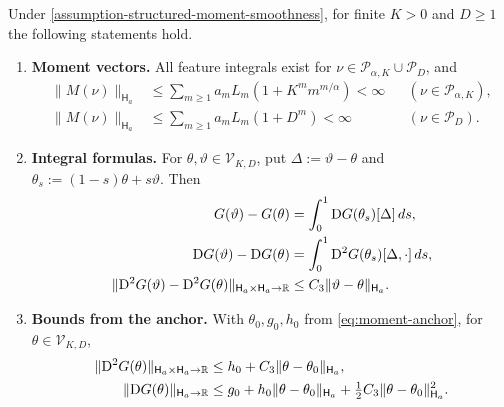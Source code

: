 \begin{lemma}
\label{lem:moment-integral-formulas}
Under \cref{assumption-structured-moment-smoothness}, for finite $K>0$
and $D\ge1$ the following statements hold.
\begin{enumerate}[label=(\roman*),leftmargin=*]
\item \textbf{Moment vectors.}
All feature integrals exist for $\nu\in\mathcal P_{\alpha,K}\cup\mathcal P_D$,
and
\begin{equation}
\label{eq:weighted-population-moment-summability}
\begin{aligned}
 \|M(\nu)\|_{\mathsf H_a}
 &\le\sum_{m\ge1}a_mL_m(1+K^m m^{m/\alpha})<\infty
       &&(\nu\in\mathcal P_{\alpha,K}),\\
 \|M(\nu)\|_{\mathsf H_a}
 &\le\sum_{m\ge1}a_mL_m(1+D^m)<\infty
       &&(\nu\in\mathcal P_D).
\end{aligned}
\end{equation}
\item \textbf{Integral formulas.}
For $\theta,\vartheta\in\mathcal V_{K,D}$, put
$\Delta:=\vartheta-\theta$ and $\theta_s:=(1-s)\theta+s\vartheta$.
Then
\begin{align}
 G(\vartheta)-G(\theta)
 &=\int_0^1\mathrm{D} G(\theta_s)[\Delta]\,ds,
 \label{eq:moment-value-integral}\\
 \mathrm{D} G(\vartheta)-\mathrm{D} G(\theta)
 &=\int_0^1\mathrm{D}^2G(\theta_s)[\Delta,\cdot]\,ds,
 \label{eq:moment-gradient-integral}\\
 \|\mathrm{D}^2G(\vartheta)-\mathrm{D}^2G(\theta)\|_{\mathsf H_a\times\mathsf H_a\to\mathbb R}
 &\le C_3\|\vartheta-\theta\|_{\mathsf H_a}.
 \label{eq:moment-hessian-lipschitz}
\end{align}
\item \textbf{Bounds from the anchor.}
With $\theta_0,g_0,h_0$ from \eqref{eq:moment-anchor}, for
$\theta\in\mathcal V_{K,D}$,
\begin{equation}
\label{eq:anchored-weighted-derivative-bounds}
\begin{aligned}
 \|\mathrm{D}^2G(\theta)\|_{\mathsf H_a\times\mathsf H_a\to\mathbb R}
 &\le h_0+C_3\|\theta-\theta_0\|_{\mathsf H_a},\\
 \|\mathrm{D} G(\theta)\|_{\mathsf H_a\to\mathbb R}
 &\le g_0+h_0\|\theta-\theta_0\|_{\mathsf H_a}
          +\tfrac12C_3\|\theta-\theta_0\|_{\mathsf H_a}^2.
\end{aligned}
\end{equation}
\end{enumerate}
\end{lemma}
